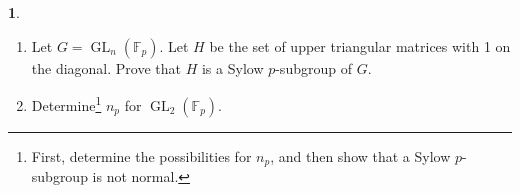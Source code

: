 \documentclass[12pt]{article}
\newcommand{\GL}{\operatorname{GL}}
\theoremstyle{definition}
\newtheorem{ex}{}
\begin{document}
\begin{ex}\
	\begin{enumerate}

		\item Let $G = \GL_n(\mathbb{F}_p)$.  Let $H$ be the set of upper triangular matrices
		      with 1 on the diagonal.  Prove that $H$ is a Sylow $p$-subgroup of $G$.

		\item Determine\footnote{First, determine the possibilities for $n_p$, and then
			      show that a Sylow $p$-subgroup is not normal.} $n_p$ for $\GL_2(\mathbb{F}_p)$.

	\end{enumerate}
\end{ex}
\end{document}
